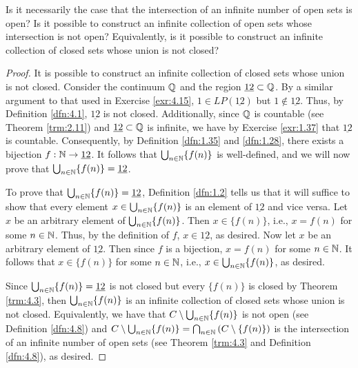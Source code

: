 \documentclass[../main.tex]{subfiles}
\begin{document}
\begin{exercise}\label{exr:4.19}
    Is it necessarily the case that the intersection of an infinite number of open sets is open? Is it possible to construct an infinite collection of open sets whose intersection is not open? Equivalently, is it possible to construct an infinite collection of closed sets whose union is not closed?
    \begin{proof}
        It is possible to construct an infinite collection of closed sets whose union is not closed. Consider the continuum $\mathbb{Q}$ and the region $\underline{12}\subset\mathbb{Q}$. By a similar argument to that used in Exercise \ref{exr:4.15}, $1\in LP(\underline{12})$ but $1\notin\underline{12}$. Thus, by Definition \ref{dfn:4.1}, $\underline{12}$ is not closed. Additionally, since $\mathbb{Q}$ is countable (see Theorem \ref{trm:2.11}) and $\underline{12}\subset\mathbb{Q}$ is infinite, we have by Exercise \ref{exr:1.37} that $\underline{12}$ is countable. Consequently, by Definition \ref{dfn:1.35} and \ref{dfn:1.28}, there exists a bijection $f:\mathbb{N}\to\underline{12}$. It follows that $\bigcup_{n\in\mathbb{N}}\{f(n)\}$ is well-defined, and we will now prove that $\bigcup_{n\in\mathbb{N}}\{f(n)\}=\underline{12}$.\par
        To prove that $\bigcup_{n\in\mathbb{N}}\{f(n)\}=\underline{12}$, Definition \ref{dfn:1.2} tells us that it will suffice to show that every element $x\in\bigcup_{n\in\mathbb{N}}\{f(n)\}$ is an element of $\underline{12}$ and vice versa. Let $x$ be an arbitrary element of $\bigcup_{n\in\mathbb{N}}\{f(n)\}$. Then $x\in\{f(n)\}$, i.e., $x=f(n)$ for some $n\in\mathbb{N}$. Thus, by the definition of $f$, $x\in\underline{12}$, as desired. Now let $x$ be an arbitrary element of $\underline{12}$. Then since $f$ is a bijection, $x=f(n)$ for some $n\in\mathbb{N}$. It follows that $x\in\{f(n)\}$ for some $n\in\mathbb{N}$, i.e., $x\in\bigcup_{n\in\mathbb{N}}\{f(n)\}$, as desired.\par
        Since $\bigcup_{n\in\mathbb{N}}\{f(n)\}=\underline{12}$ is not closed but every $\{f(n)\}$ is closed by Theorem \ref{trm:4.3}, then $\bigcup_{n\in\mathbb{N}}\{f(n)\}$ is an infinite collection of closed sets whose union is not closed. Equivalently, we have that $C\setminus\bigcup_{n\in\mathbb{N}}\{f(n)\}$ is not open (see Definition \ref{dfn:4.8}) and $C\setminus\bigcup_{n\in\mathbb{N}}\{f(n)\}=\bigcap_{n\in\mathbb{N}}\left( C\setminus\{f(n)\} \right)$ is the intersection of an infinite number of open sets (see Theorem \ref{trm:4.3} and Definition \ref{dfn:4.8}), as desired.
    \end{proof}
\end{exercise}
\end{document}
